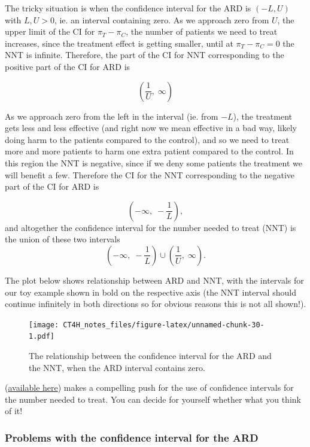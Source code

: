\documentclass[
  openany]{book}
\theoremstyle{definition}
\theoremstyle{definition}
\theoremstyle{definition}
\theoremstyle{definition}
\theoremstyle{remark}
\begin{document}
The tricky situation is when the confidence interval for the ARD is \(\left(-L, U\right)\) with \(L,U>0\), ie. an interval containing zero. As we approach zero from \(U\), the upper limit of the CI for \(\pi_T - \pi_C\), the number of patients we need to treat increases, since the treatment effect is getting smaller, until at \(\pi_T - \pi_C=0\) the NNT is infinite. Therefore, the part of the CI for NNT corresponding to the positive part of the CI for ARD is

\[\left(\frac{1}{U},\; \infty\right)\]

As we approach zero from the left in the interval (ie. from \(-L\)), the treatment gets less and less effective (and right now we mean effective in a bad way, likely doing harm to the patients compared to the control), and so we need to treat more and more patients to harm one extra patient compared to the control. In this region the NNT is negative, since if we deny some patients the treatment we will benefit a few. Therefore the CI for the NNT corresponding to the negative part of the CI for ARD is

\[\left(-\infty,\;-\frac{1}{L}\right), \]
and altogether the confidence interval for the number needed to treat (NNT) is the union of these two intervals
\[\left(-\infty,\;-\frac{1}{L}\right) \cup \left(\frac{1}{U},\; \infty\right).\]

The plot below shows relationship between ARD and NNT, with the intervals for our toy example shown in bold on the respective axis (the NNT interval should continue infinitely in both directions so for obvious reasons this is not all shown!).

\begin{figure}
\centering
\texttt{[image: CT4H\_notes\_files/figure-latex/unnamed-chunk-30-1.pdf]}
\caption{\label{fig:unnamed-chunk-30}The relationship between the confidence interval for the ARD and the NNT, when the ARD interval contains zero.}
\end{figure}

\citet{altman1998confidence} (\href{https://www.bmj.com/content/bmj/317/7168/1309.full.pdf}{available here}) makes a compelling push for the use of confidence intervals for the number needed to treat. You can decide for yourself whether what you think of it!

\hypertarget{problems-with-the-confidence-interval-for-the-ard}{%
\subsubsection*{Problems with the confidence interval for the ARD}\label{problems-with-the-confidence-interval-for-the-ard}}
\end{document}
